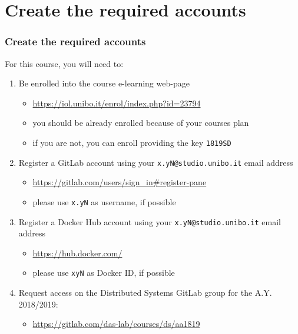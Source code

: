 \documentclass[handout]{beamer}\mode<presentation>{\usetheme{AMSCesenaBleu}}
\begin{document}
\section{Create the required accounts}

\begin{frame}\label{configure-accounts}
\frametitle{Create the required accounts}
    
    For this course, you will need to:
    \begin{enumerate}
        \item Be enrolled into the course e-learning web-page
        \begin{itemize}
            \item \url{https://iol.unibo.it/enrol/index.php?id=23794}
            \item you should be already enrolled because of your courses plan
            \item if you are not, you can enroll providing the key \alert{\texttt{1819SD}}
        \end{itemize}
        
        \item Register a GitLab account using your \alert{\texttt{x.yN@studio.unibo.it}} email address
        \begin{itemize}
            \item \url{https://gitlab.com/users/sign_in\#register-pane}
            \item please use \texttt{x.yN} as username, if possible
        \end{itemize}
        
        \item Register a Docker Hub account using your \alert{\texttt{x.yN@studio.unibo.it}} email address
        \begin{itemize}
            \item \url{https://hub.docker.com/}
            \item please use \texttt{xyN} as Docker ID, if possible
        \end{itemize}
        
        \item Request access on the Distributed Systems GitLab group for the A.Y. 2018/2019:
        \begin{itemize}
            \item \url{https://gitlab.com/das-lab/courses/ds/aa1819}
        \end{itemize}
        
    \end{enumerate}
    
\end{frame}
\end{document}
